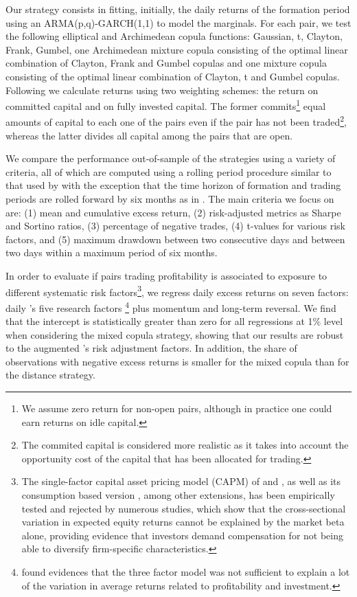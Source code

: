  Our strategy consists in fitting, initially, the daily returns of the formation period using an ARMA(p,q)-GARCH(1,1) to model the marginals. For each pair, we test the following elliptical and Archimedean copula functions: Gaussian, t, Clayton, Frank, Gumbel, one Archimedean mixture copula consisting of the optimal linear combination of Clayton, Frank and Gumbel copulas and one mixture copula consisting of the optimal linear combination of Clayton, t and Gumbel copulas. Following \citet*{ggr06} we calculate returns using two weighting schemes: the return on committed capital and on fully invested capital. The former commits\footnote{We assume zero return for non-open pairs, although in practice one could earn returns on idle capital.} equal amounts of capital to each one of the pairs even if the pair has not been traded\footnote{The commited capital is considered more realistic as it takes into account the opportunity cost of the capital that has been allocated for trading.}, whereas the latter divides all capital among the pairs that are open.
	
We compare the performance out-of-sample of the strategies using a variety of criteria, all of which are computed using a rolling period procedure similar to that used by \citet*{ggr06} with the exception that the time horizon of formation and trading periods are rolled forward by six months as in \citet*{bv12}. The main criteria we focus on are: (1) mean and cumulative excess return, (2) risk-adjusted metrics as Sharpe and Sortino ratios, (3) percentage of negative trades, (4) t-values for various risk factors, and (5) maximum drawdown between two consecutive days and between two days within a maximum period of six months.

	In order to evaluate if pairs trading profitability is associated to exposure to different systematic risk factors\footnote{The single-factor capital asset pricing model (CAPM) of \citet*{s64} and \citet*{l65}, as well as its consumption based version \citep{b79}, among other extensions, has been empirically tested and rejected by numerous studies, which show that the cross-sectional variation in expected equity returns cannot be explained by the market beta alone, providing evidence that investors demand compensation for not being able to diversify firm-specific characteristics.}, we regress daily excess returns on seven factors: daily \citet*{ff15}'s five research factors \footnote{\citet*{ff15} found evidences that the three factor model was not sufficient to explain a lot of the variation in average returns related to profitability and investment.} plus momentum and long-term reversal. We find that the intercept is statistically greater than zero for all regressions at 1\% level when considering the mixed copula strategy, showing that our results are robust to the augmented \citet*{ff15}'s risk adjustment factors. In addition, the share of observations with negative excess returns is smaller for the mixed copula than for the distance strategy.
	
